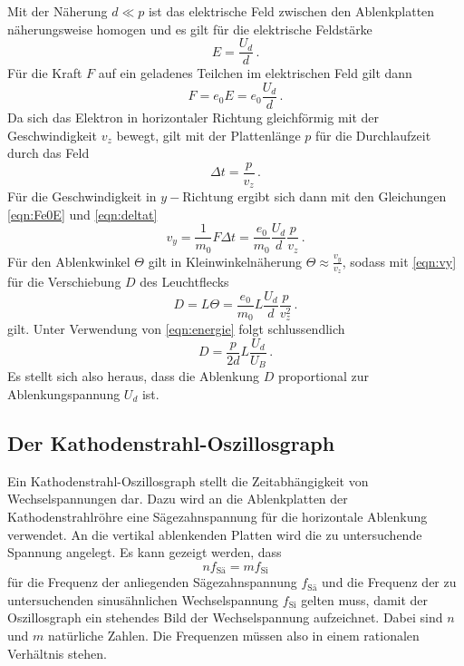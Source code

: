 Mit der Näherung $d \ll p$ ist das elektrische Feld zwischen den Ablenkplatten näherungsweise
homogen und es gilt für die elektrische Feldstärke
\begin{equation}
  E = \frac{U_d}{d}\,.
  \label{eqn:EUd}
\end{equation}
Für die Kraft $F$ auf ein geladenes Teilchen im elektrischen Feld gilt dann
\begin{equation}
  F = e_0 E = e_0 \frac{U_d}{d}\,.
  \label{eqn:Fe0E}
\end{equation}
Da sich das Elektron in horizontaler Richtung gleichförmig mit der Geschwindigkeit
$v_z$ bewegt, gilt mit der Plattenlänge $p$ für die Durchlaufzeit durch das Feld
\begin{equation}
  \Delta t = \frac{p}{v_z}\,.
  \label{eqn:deltat}
\end{equation}
Für die Geschwindigkeit in $y-\text{Richtung}$ ergibt sich dann mit den Gleichungen
\eqref{eqn:Fe0E} und \eqref{eqn:deltat}
\begin{equation}
  v_y = \frac{1}{m_0} F \Delta t = \frac{e_0}{m_0}\frac{U_d}{d}\frac{p}{v_z}\,.
  \label{eqn:vy}
\end{equation}
Für den Ablenkwinkel $\Theta$ gilt in Kleinwinkelnäherung $\Theta \approx \frac{v_y}{v_z}$, sodass
mit \eqref{eqn:vy} für die Verschiebung $D$ des Leuchtflecks
\begin{equation}
  D = L \Theta = \frac{e_0}{m_0} L \frac{U_d}{d}\frac{p}{v_z^2}\,.
\end{equation}
gilt. Unter Verwendung von \eqref{eqn:energie} folgt schlussendlich
\begin{equation}
  D = \frac{p}{2d} L \frac{U_d}{U_B}\,.
\end{equation}
Es stellt sich also heraus, dass die Ablenkung $D$ proportional zur Ablenkungspannung
$U_d$ ist.
\subsection{Der Kathodenstrahl-Oszillosgraph}
\label{subsec:oszi}
Ein Kathodenstrahl-Oszillosgraph stellt die Zeitabhängigkeit von Wechselspannungen dar.
Dazu wird an die Ablenkplatten der Kathodenstrahlröhre eine Sägezahnspannung für die
horizontale Ablenkung verwendet. An die vertikal ablenkenden Platten wird die zu untersuchende
Spannung angelegt. Es kann gezeigt werden, dass
\begin{equation}
  n f_\text{Sä} = m f_\text{Si}
\end{equation}
für die Frequenz der anliegenden Sägezahnspannung $f_\text{Sä}$ und die Frequenz
der zu untersuchenden sinusähnlichen Wechselspannung $f_\text{Si}$ gelten muss, damit
der Oszillosgraph ein stehendes Bild der Wechselspannung aufzeichnet. Dabei sind
$n$ und $m$ natürliche Zahlen. Die Frequenzen müssen also in einem rationalen
Verhältnis stehen.

